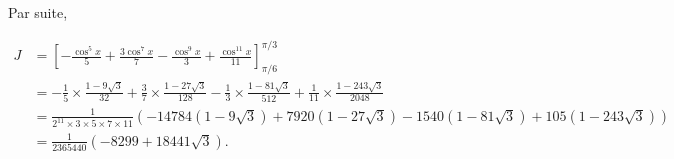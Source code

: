 {{Par suite,

\begin{align*}
J&=\left[-\frac{\cos^5x}{5}+\frac{3\cos^7x}{7}-\frac{\cos^9x}{3}+\frac{\cos^{11}x}{11}\right]_{\pi/6}^{\pi/3}\\
 &=-\frac{1}{5}\times\frac{1-9\sqrt{3}}{32}+\frac{3}{7}\times\frac{1-27\sqrt{3}}{128}-\frac{1}{3}\times\frac{1-81\sqrt
{3}}{512}+\frac{1}{11}\times\frac{1-243\sqrt{3}}{2048}\\
 &=\frac{1}{2^{11}\times3\times5\times7\times11}(-14784(1-9\sqrt{3})+7920(1-27\sqrt{3})-154
0(1-81\sqrt{3})+105(1-243\sqrt{3}))\\
 &=\frac{1}{{2365440}}(-{8299}+{18441}\sqrt{3}).
\end{align*}
}
}
